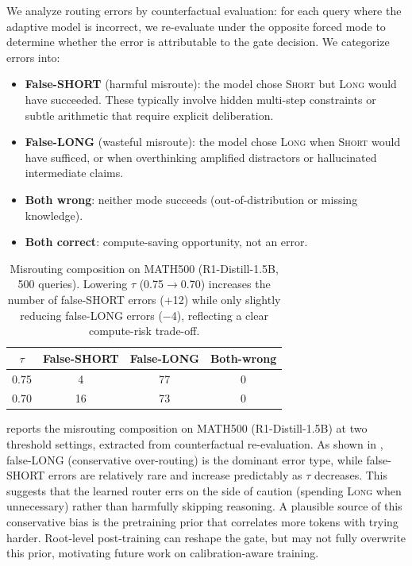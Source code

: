We analyze routing errors by counterfactual evaluation: for each query where the adaptive model is incorrect, we re-evaluate under the opposite forced mode to determine whether the error is attributable to the gate decision. We categorize errors into:

\begin{itemize}
    \item \textbf{False-SHORT} (harmful misroute): the model chose \textsc{Short} but \textsc{Long} would have succeeded. These typically involve hidden multi-step constraints or subtle arithmetic that require explicit deliberation.
    
    \item \textbf{False-LONG} (wasteful misroute): the model chose \textsc{Long} when \textsc{Short} would have sufficed, or when overthinking amplified distractors or hallucinated intermediate claims.
    
    \item \textbf{Both wrong}: neither mode succeeds (out-of-distribution or missing knowledge).
    
    \item \textbf{Both correct}: compute-saving opportunity, not an error.
\end{itemize}

\begin{table}[t]
\centering
\small
\caption{Misrouting composition on MATH500 (R1-Distill-1.5B, 500 queries). Lowering $\tau$ (0.75$\to$0.70) increases the number of false-SHORT errors (+12) while only slightly reducing false-LONG errors ($-$4), reflecting a clear compute-risk trade-off. }
\label{tab:misrouting}
\begin{tabular}{c|ccc}
\toprule
$\tau$ & \textbf{False-SHORT} & \textbf{False-LONG} & \textbf{Both-wrong} \\
\midrule
0.75 & 4 & 77 & 0 \\
0.70 & 16 & 73 & 0 \\
\bottomrule
\end{tabular}
\end{table}

 reports the misrouting composition on MATH500 (R1-Distill-1.5B) at two threshold settings, extracted from counterfactual re-evaluation.
As shown in , false-LONG (conservative over-routing) is the dominant error type, while false-SHORT errors are relatively rare and increase predictably as $\tau$ decreases. This suggests that the learned router errs on the side of caution (spending \textsc{Long} when unnecessary) rather than harmfully skipping reasoning. A plausible source of this conservative bias is the pretraining prior that correlates more tokens with trying harder. Root-level post-training can reshape the gate, but may not fully overwrite this prior, motivating future work on calibration-aware training.

